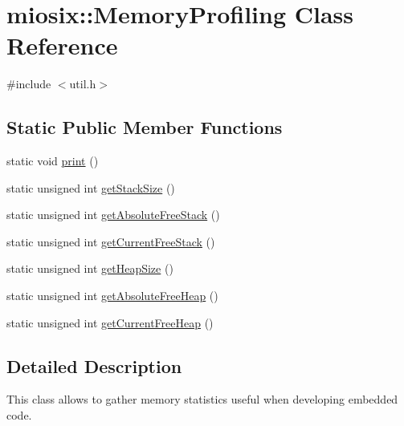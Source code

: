 \hypertarget{classmiosix_1_1_memory_profiling}{\section{miosix\-:\-:Memory\-Profiling Class Reference}
\label{classmiosix_1_1_memory_profiling}
}


{\ttfamily \#include $<$util.\-h$>$}

\subsection*{Static Public Member Functions}
\begin{DoxyCompactItemize}
\item 
static void \hyperlink{classmiosix_1_1_memory_profiling_ad49f0f486487a4fa165883eb45ad5f4e}{print} ()
\item 
static unsigned int \hyperlink{classmiosix_1_1_memory_profiling_ab01517dcb40ae74f6cb17a54baf5d00d}{get\-Stack\-Size} ()
\item 
static unsigned int \hyperlink{classmiosix_1_1_memory_profiling_af653e0d570d4cf3c358871c5c56e7f87}{get\-Absolute\-Free\-Stack} ()
\item 
static unsigned int \hyperlink{classmiosix_1_1_memory_profiling_ab4a3fc09f4d48b7761c52fbe18e683ee}{get\-Current\-Free\-Stack} ()
\item 
static unsigned int \hyperlink{classmiosix_1_1_memory_profiling_acc5945c41f0ccf00c35d256fe8dbf30a}{get\-Heap\-Size} ()
\item 
static unsigned int \hyperlink{classmiosix_1_1_memory_profiling_af09789fc33f2a1768cad7fad8cf7488b}{get\-Absolute\-Free\-Heap} ()
\item 
static unsigned int \hyperlink{classmiosix_1_1_memory_profiling_ab49f252e7a4800d3b076102eb6562fed}{get\-Current\-Free\-Heap} ()
\end{DoxyCompactItemize}


\subsection{Detailed Description}
This class allows to gather memory statistics useful when developing embedded code. 

